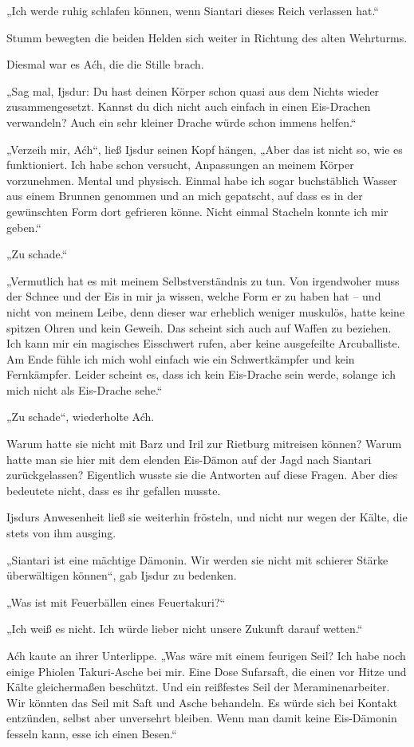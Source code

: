 „Ich werde ruhig schlafen können, wenn Siantari dieses Reich verlassen hat.“

Stumm bewegten die beiden Helden sich weiter in Richtung des alten Wehrturms.

Diesmal war es Aćh, die die Stille brach.

„Sag mal, Ijsdur: Du hast deinen Körper schon quasi aus dem Nichts wieder zusammengesetzt. Kannst du dich nicht auch einfach in einen Eis-Drachen verwandeln? Auch ein sehr kleiner Drache würde schon immens helfen.“

„Verzeih mir, Aćh“, ließ Ijsdur seinen Kopf hängen, „Aber das ist nicht so, wie es funktioniert. Ich habe schon versucht, Anpassungen an meinem Körper vorzunehmen. Mental und physisch. Einmal habe ich sogar buchstäblich Wasser aus einem Brunnen genommen und an mich gepatscht, auf dass es in der gewünschten Form dort gefrieren könne. Nicht einmal Stacheln konnte ich mir geben.“

„Zu schade.“

„Vermutlich hat es mit meinem Selbstverständnis zu tun. Von irgendwoher muss der Schnee und der Eis in mir ja wissen, welche Form er zu haben hat – und nicht von meinem Leibe, denn dieser war erheblich weniger muskulös, hatte keine spitzen Ohren und kein Geweih. Das scheint sich auch auf Waffen zu beziehen. Ich kann mir ein magisches Eisschwert rufen, aber keine ausgefeilte Arcuballiste. Am Ende fühle ich mich wohl einfach wie ein Schwertkämpfer und kein Fernkämpfer. Leider scheint es, dass ich kein Eis-Drache sein werde, solange ich mich nicht als Eis-Drache sehe.“

„Zu schade“, wiederholte Aćh.

Warum hatte sie nicht mit Barz und Iril zur Rietburg mitreisen können? Warum hatte man sie hier mit dem elenden Eis-Dämon auf der Jagd nach Siantari zurückgelassen? Eigentlich wusste sie die Antworten auf diese Fragen. Aber dies bedeutete nicht, dass es ihr gefallen musste.

Ijsdurs Anwesenheit ließ sie weiterhin frösteln, und nicht nur wegen der Kälte, die stets von ihm ausging.

„Siantari ist eine mächtige Dämonin. Wir werden sie nicht mit schierer Stärke überwältigen können“, gab Ijsdur zu bedenken.

„Was ist mit Feuerbällen eines Feuertakuri?“

„Ich weiß es nicht. Ich würde lieber nicht unsere Zukunft darauf wetten.“

Aćh kaute an ihrer Unterlippe. „Was wäre mit einem feurigen Seil? Ich habe noch einige Phiolen Takuri-Asche bei mir. Eine Dose Sufarsaft, die einen vor Hitze und Kälte gleichermaßen beschützt. Und ein reißfestes Seil der Meraminenarbeiter. Wir könnten das Seil mit Saft und Asche behandeln. Es würde sich bei Kontakt entzünden, selbst aber unversehrt bleiben. Wenn man damit keine Eis-Dämonin fesseln kann, esse ich einen Besen.“

